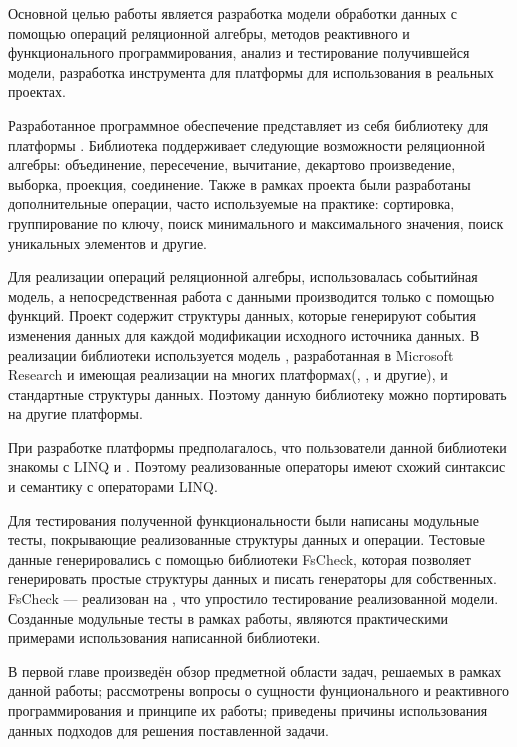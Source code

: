 


Основной целью работы является разработка модели обработки данных с помощью операций реляционной алгебры, методов реактивного и функционального программирования, анализ и тестирование получившейся модели, разработка инструмента для платформы \dotnet{} для использования в реальных проектах.

Разработанное программное обеспечение представляет из себя библиотеку для платформы \dotnet{}.
Библиотека поддерживает следующие возможности реляционной алгебры: объединение, пересечение, вычитание, декартово произведение, выборка, проекция, соединение. Также в рамках проекта были разработаны дополнительные операции, часто используемые на практике: сортировка, группирование по ключу, поиск минимального и максимального значения, поиск уникальных элементов и другие.

Для реализации операций реляционной алгебры, использовалась событийная модель, а непосредственная работа с данными производится только с помощью функций.
Проект содержит структуры данных, которые генерируют события изменения данных для каждой модификации исходного источника данных. В реализации библиотеки используется модель \rx{}, разработанная в Micro\-soft Re\-search и имеющая реализации на многих платформах(\java{},  \python{}, \javascript{} и другие), и стандартные структуры данных. Поэтому данную библиотеку можно портировать на другие платформы.

При разработке платформы предполагалось, что пользователи данной библиотеки знакомы с LINQ и \rx{}. Поэтому реализованные операторы имеют схожий синтаксис и семантику с операторами LINQ.

Для тестирования полученной функциональности были написаны модульные тесты, покрывающие реализованные структуры данных и операции. Тестовые данные генерировались с помощью библиотеки FsCheck, которая позволяет генерировать простые структуры данных и писать генераторы для собственных. FsCheck --- реализован на \fsharp{}, что упростило тестирование реализованной модели. Созданные модульные тесты в рамках работы, являются практическими примерами использования написанной библиотеки.



В первой главе произведён обзор предметной области задач, решаемых в рамках данной работы; рассмотрены вопросы о сущности фунционального и реактивного программирования и принципе их работы; приведены причины использования данных подходов для решения поставленной задачи.

